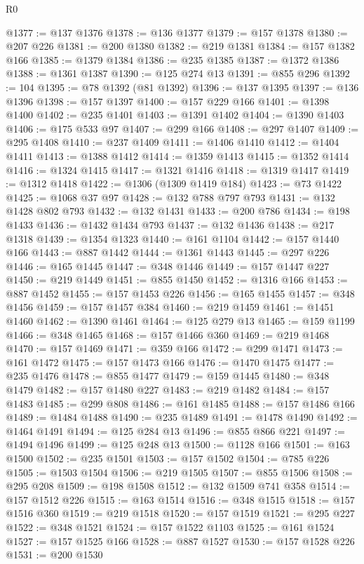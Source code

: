 \begin{lexlean}{R0}
\begin{coremodule}
@1377 := @137 @1376
@1378 := @136 @1377
@1379 := @157 @1378
@1380 := @207 @226
@1381 := @200 @1380
@1382 := @219 @1381
@1384 := @157 @1382 @166
@1385 := @1379 @1384
@1386 := @235 @1385
@1387 := @1372 @1386
@1388 := @1361 @1387
@1390 := @125 @274 @13
@1391 := @855 @296
@1392 := 104
@1395 := @78 @1392 (@81 @1392)
@1396 := @137 @1395
@1397 := @136 @1396
@1398 := @157 @1397
@1400 := @157 @229 @166
@1401 := @1398 @1400
@1402 := @235 @1401
@1403 := @1391 @1402
@1404 := @1390 @1403
@1406 := @175 @533 @97
@1407 := @299 @166
@1408 := @297 @1407
@1409 := @295 @1408
@1410 := @237 @1409
@1411 := @1406 @1410
@1412 := @1404 @1411
@1413 := @1388 @1412
@1414 := @1359 @1413
@1415 := @1352 @1414
@1416 := @1324 @1415
@1417 := @1321 @1416
@1418 := @1319 @1417
@1419 := @1312 @1418
@1422 := @1306 (@1309 @1419 @184)
@1423 := @73 @1422
@1425 := @1068 @37 @97
@1428 := @132 @788 @797 @793
@1431 := @132 @1428 @802 @793
@1432 := @132 @1431
@1433 := @200 @786
@1434 := @198 @1433
@1436 := @1432 @1434 @793
@1437 := @132 @1436
@1438 := @217 @1318
@1439 := @1354 @1323
@1440 := @161 @1104
@1442 := @157 @1440 @166
@1443 := @887 @1442
@1444 := @1361 @1443
@1445 := @297 @226
@1446 := @165 @1445
@1447 := @348 @1446
@1449 := @157 @1447 @227
@1450 := @219 @1449
@1451 := @855 @1450
@1452 := @1316 @166
@1453 := @887 @1452
@1455 := @157 @1453 @226
@1456 := @165 @1455
@1457 := @348 @1456
@1459 := @157 @1457 @384
@1460 := @219 @1459
@1461 := @1451 @1460
@1462 := @1390 @1461
@1464 := @125 @279 @13
@1465 := @159 @1199
@1466 := @348 @1465
@1468 := @157 @1466 @360
@1469 := @219 @1468
@1470 := @157 @1469
@1471 := @359 @166
@1472 := @299 @1471
@1473 := @161 @1472
@1475 := @157 @1473 @166
@1476 := @1470 @1475
@1477 := @235 @1476
@1478 := @855 @1477
@1479 := @159 @1445
@1480 := @348 @1479
@1482 := @157 @1480 @227
@1483 := @219 @1482
@1484 := @157 @1483
@1485 := @299 @808
@1486 := @161 @1485
@1488 := @157 @1486 @166
@1489 := @1484 @1488
@1490 := @235 @1489
@1491 := @1478 @1490
@1492 := @1464 @1491
@1494 := @125 @284 @13
@1496 := @855 @866 @221
@1497 := @1494 @1496
@1499 := @125 @248 @13
@1500 := @1128 @166
@1501 := @163 @1500
@1502 := @235 @1501
@1503 := @157 @1502
@1504 := @785 @226
@1505 := @1503 @1504
@1506 := @219 @1505
@1507 := @855 @1506
@1508 := @295 @208
@1509 := @198 @1508
@1512 := @132 @1509 @741 @358
@1514 := @157 @1512 @226
@1515 := @163 @1514
@1516 := @348 @1515
@1518 := @157 @1516 @360
@1519 := @219 @1518
@1520 := @157 @1519
@1521 := @295 @227
@1522 := @348 @1521
@1524 := @157 @1522 @1103
@1525 := @161 @1524
@1527 := @157 @1525 @166
@1528 := @887 @1527
@1530 := @157 @1528 @226
@1531 := @200 @1530

\end{coremodule}
\end{lexlean}

